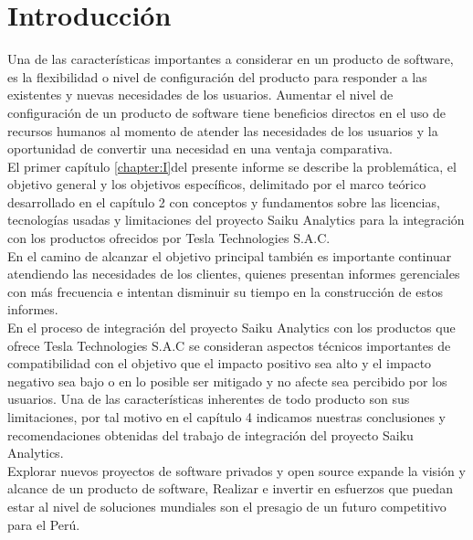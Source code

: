 \clearpage
{}
{}

\chapter*{Introducción}
\begin{spacing}{1.5}
	Una de las características importantes a considerar en un producto de software, es la flexibilidad o nivel de configuración del producto para responder a las existentes y nuevas necesidades de los usuarios. Aumentar el nivel de configuración de un producto de software tiene beneficios directos en el uso de recursos humanos al momento de atender las necesidades de los usuarios y la oportunidad de convertir una necesidad en una ventaja comparativa.\\
	El primer capítulo \ref{chapter:I}del presente informe se describe la problemática, el objetivo general y los objetivos específicos, delimitado por el marco teórico desarrollado en el capítulo 2 con conceptos y fundamentos sobre las licencias, tecnologías usadas y limitaciones del proyecto Saiku Analytics para la integración con los productos ofrecidos por Tesla Technologies S.A.C.\\
	En el camino de alcanzar el objetivo principal también es importante continuar atendiendo las necesidades de los clientes, quienes presentan informes gerenciales con más frecuencia e intentan disminuir su tiempo en la construcción de estos informes.\\
	En el proceso de integración del proyecto Saiku Analytics con los productos que ofrece Tesla Technologies S.A.C se consideran aspectos técnicos importantes de compatibilidad con el objetivo que el impacto positivo sea alto y el impacto negativo sea bajo o en lo posible ser mitigado y no afecte sea percibido por los usuarios. 
	Una de las características inherentes de todo producto son sus limitaciones, por tal motivo en el capítulo 4 indicamos nuestras conclusiones y recomendaciones obtenidas del trabajo de integración del proyecto Saiku Analytics.\\
	Explorar nuevos proyectos de software privados y open source expande la visión y alcance de un producto de software, Realizar e invertir en esfuerzos que puedan estar al nivel de soluciones mundiales son el presagio de un futuro competitivo para el Perú.\\
\end{spacing}
